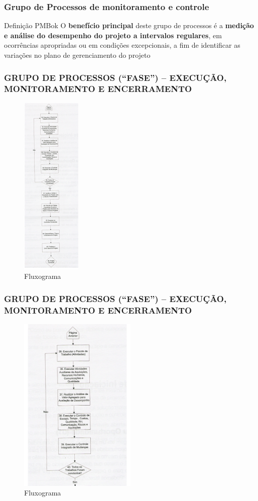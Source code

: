 \begin{frame}
 \frametitle{Grupo de Processos de monitoramento e controle}
 \begin{block}{Definição PMBok}
O \textbf{benefício principal}  deste grupo de
processos é a \textbf{medição e análise do desempenho do projeto a intervalos regulares}, em ocorrências apropriadas
ou em condições excepcionais, a fim de identificar as variações no plano de gerenciamento do projeto
 \end{block}
\end{frame}


\begin{frame}
 \frametitle{GRUPO DE PROCESSOS (“FASE”) – \small{EXECUÇÃO, MONITORAMENTO E ENCERRAMENTO}}
  \begin{figure}
   \centering
   \includegraphics[heigth = \textheight]{figs/fig1.png}
   \caption{Fluxograma}
  \end{figure}
\end{frame}

\begin{frame}
 \frametitle{GRUPO DE PROCESSOS (“FASE”) – \small{EXECUÇÃO, MONITORAMENTO E ENCERRAMENTO}}
  \begin{figure}
   \centering
   \includegraphics[width = 0.5\textwidth]{figs/fig2.png}
   \caption{Fluxograma}
  \end{figure}
\end{frame}

